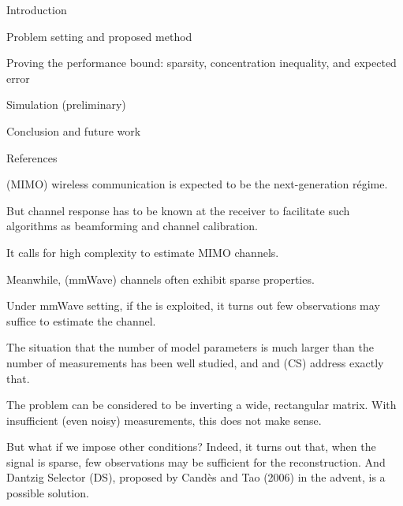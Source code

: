 

\Title {\TitleText}
\blank [big]

\Subtitle {\AuthorText}
\blank [big]

\Subsubtitle {\DateText}

\page [yes]
{
\I Introduction

\I Problem setting and proposed method

\I Proving the performance bound: sparsity, concentration inequality, and expected error

\I Simulation (preliminary)

\I Conclusion and future work

\I References
}
{
\I {} (MIMO) wireless communication is expected to be the next-generation r\'egime.

\I But channel response has to be known at the receiver to facilitate such algorithms as beamforming and channel calibration.

\I It calls for high complexity to estimate MIMO channels.

\I Meanwhile,  (mmWave) channels often exhibit sparse properties.

\I Under mmWave setting, if the  is exploited, it turns out few observations may suffice to estimate the channel.
}
{
\I The situation that the number of model parameters is much larger than the number of measurements has been well studied, and and  (CS) address exactly that.

\I The problem can be considered to be inverting a wide, rectangular matrix.
With insufficient (even noisy) measurements, this does not make sense.

\I But what if we impose other conditions?
Indeed, it turns out that, when the signal is sparse, few observations may be sufficient for the reconstruction.
And Dantzig Selector (DS), proposed by Cand\`es and Tao (2006) in the advent, is a possible solution.
}

